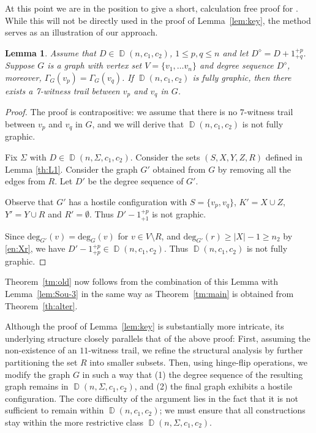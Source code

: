 \documentclass[11pt]{elsarticle}
\theoremstyle{plain}
\newtheorem*{lemma*}{Lemma}
\theoremstyle{definition}
\def\deg{\mathrm{deg}}
\newcommand{\dd}[3]{\operatorname{\mathbb D}(#1,#2,#3)}
\newcommand{\dds}[4]{\operatorname{\mathbb D}(#1,#2,#3,#4)}
\begin{document}
At this point we are in the position to give a short, calculation free proof for \cite[Lemma 4.5]{fully}. While this will not be directly used in the proof of Lemma~\ref{lem:key}, the method serves as an illustration of our approach.

\begin{lemma*}
Assume that  $D\in \dd{n}{c_1}{c_2}$, $1\le p,q\le n$ and  let $D^\diamond=D+ 1^{+p}_{+q}$.  Suppose  $G$ is a graph with vertex set $V=\{v_1,\dots v_n\}$ and
degree sequence $D^\diamond$, moreover,  $\Gamma_G(v_p)=\Gamma_G(v_q)$. If $\dd{n}{c_1}{c_2}$ is fully graphic, then  there exists a 7-witness trail between $v_p$ and $v_q$ in $G$.
\end{lemma*}


\begin{proof}
    The proof is contrapositive: we assume that there is no $7$-witness trail between $v_p$ and $v_q$ in $G$, and we will
    derive that $\dd{n}{c_1}{c_2}$ is not fully graphic.

    Fix $\Sigma$ with $D\in \dds{n}{\Sigma}{c_1}{c_2}$.
    Consider the sets $(S,X,Y,Z,R)$ defined in  Lemma \ref{th:L1}.
    Consider the graph $G'$ obtained from $G$ by removing all the edges from $R$. Let $D'$ be the degree sequence of $G'$.

    Observe that  $G'$ has a hostile configuration with $S=\{v_p,v_q\}$, $K'=X\cup Z$, $Y'=Y\cup R$ and $R'=\emptyset$. Thus $D'-1^{+p}_{+1}$ is not graphic.

    Since   $\deg_{G'}(v)=\deg_{G}(v)$   for $v\in V\setminus R$, and $\deg_{G'}(r)\ge |X|-1\ge n_2$ by \eqref{en:Xr}, we have  $D'-1^{+p}_{+p}\in \dd{n}{c_1}{c_2}$. Thus $\dd{n}{c_1}{c_2}$ is not fully graphic.
\end{proof}

Theorem~\ref{tm:old} now follows from the combination of this Lemma with Lemma~\ref{lem:Sou-3} in the same way as Theorem~\ref{tm:main} is obtained from Theorem~\ref{th:alter}.


    Although the proof of Lemma~\ref{lem:key} is substantially more intricate, its underlying structure closely parallels that of the above proof:
    First, assuming the non-existence of an $11$-witness trail, we refine the structural analysis by further partitioning the set $R$ into smaller subsets.
    Then, using hinge-flip operations, we modify the graph $G$ in such a way that
    (1) the degree sequence of the resulting graph remains in $\dds{n}{\Sigma}{c_1}{c_2}$, and
    (2) the final graph exhibits a hostile configuration.
    The core difficulty of the argument lies in the fact that it is not sufficient to remain within $\dd{n}{c_1}{c_2}$;
    we must ensure that all constructions stay within the more restrictive class $\dds{n}{\Sigma}{c_1}{c_2}$.
\end{document}
